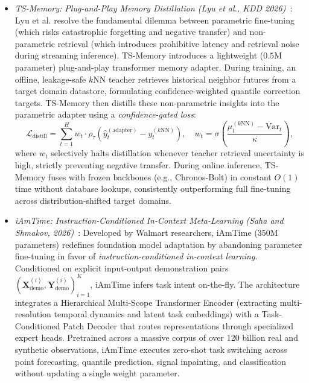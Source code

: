 \begin{itemize}[leftmargin=*]
    \item \emph{TS-Memory: Plug-and-Play Memory Distillation (Lyu et al., KDD 2026)}~\cite{lyu2026tsmemory}: Lyu et al. resolve the fundamental dilemma between parametric fine-tuning (which risks catastrophic forgetting and negative transfer) and non-parametric retrieval (which introduces prohibitive latency and retrieval noise during streaming inference). TS-Memory introduces a lightweight ($0.5\text{M}$ parameter) plug-and-play transformer memory adapter. During training, an offline, leakage-safe $k\text{NN}$ teacher retrieves historical neighbor futures from a target domain datastore, formulating confidence-weighted quantile correction targets. TS-Memory then distills these non-parametric insights into the parametric adapter using a \emph{confidence-gated loss}:
    \begin{equation}
        \mathcal{L}_{\text{distill}} = \sum_{t=1}^H w_t \cdot \rho_\tau\left(\hat{y}_{t}^{(\text{adapter})} - y_{t}^{(k\text{NN})}\right), \quad w_t = \sigma\left(\frac{\mu_t^{(k\text{NN})} - \text{Var}_t}{\kappa}\right),
    \end{equation}
    where $w_t$ selectively halts distillation whenever teacher retrieval uncertainty is high, strictly preventing negative transfer. During online inference, TS-Memory fuses with frozen backbones (e.g., Chronos-Bolt) in constant $O(1)$ time without database lookups, consistently outperforming full fine-tuning across distribution-shifted target domains.

    \item \emph{iAmTime: Instruction-Conditioned In-Context Meta-Learning (Saha and Shmakov, 2026)}~\cite{saha2026iamtime}: Developed by Walmart researchers, iAmTime (350M parameters) redefines foundation model adaptation by abandoning parameter fine-tuning in favor of \emph{instruction-conditioned in-context learning}. Conditioned on explicit input-output demonstration pairs $(\mathbf{X}_{\text{demo}}^{(i)}, \mathbf{Y}_{\text{demo}}^{(i)})_{i=1}^K$, iAmTime infers task intent on-the-fly. The architecture integrates a Hierarchical Multi-Scope Transformer Encoder (extracting multi-resolution temporal dynamics and latent task embeddings) with a Task-Conditioned Patch Decoder that routes representations through specialized expert heads. Pretrained across a massive corpus of over 120 billion real and synthetic observations, iAmTime executes zero-shot task switching across point forecasting, quantile prediction, signal inpainting, and classification without updating a single weight parameter.


\end{itemize}
